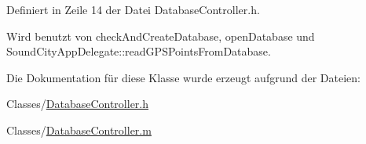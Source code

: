 Definiert in Zeile 14 der Datei DatabaseController.h.

Wird benutzt von checkAndCreateDatabase, openDatabase und SoundCityAppDelegate::readGPSPointsFromDatabase.

Die Dokumentation für diese Klasse wurde erzeugt aufgrund der Dateien:\begin{DoxyCompactItemize}
\item 
Classes/\hyperlink{_database_controller_8h}{DatabaseController.h}\item 
Classes/\hyperlink{_database_controller_8m}{DatabaseController.m}\end{DoxyCompactItemize}
